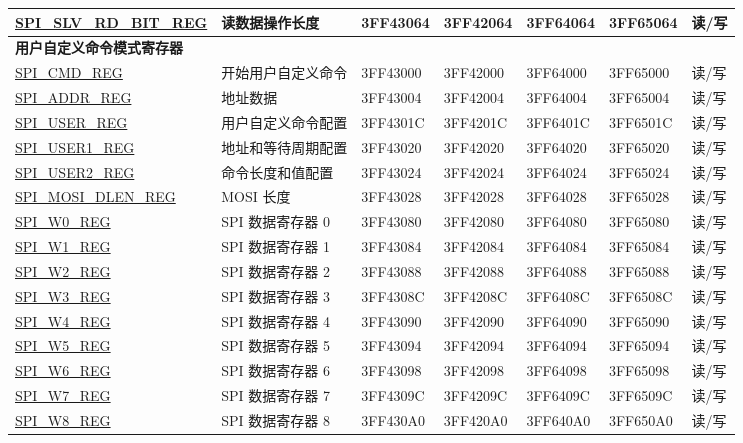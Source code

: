 \begin{longtable}[l]{ | p{5.75cm} | p{3.2cm} | p{1.45cm} | p{1.45cm} | p{1.45cm} | p{1.45cm} |p{0.74cm} | }
\hyperref[regdesc:SPISLVRDBITREG]{SPI\_SLV\_RD\_BIT\_REG} & 读数据操作长度 & 3FF43064 & 3FF42064 & 3FF64064 & 3FF65064 & 读/写 \\ \hline
\multicolumn{7}{|l|}{\textbf{用户自定义命令模式寄存器}} \\ \hline
\hyperref[regdesc:SPICMDREG]{SPI\_CMD\_REG} & 开始用户自定义命令 & 3FF43000 & 3FF42000 & 3FF64000 & 3FF65000 & 读/写 \\ \hline
\hyperref[regdesc:SPIADDRREG]{SPI\_ADDR\_REG} & 地址数据 & 3FF43004 & 3FF42004 & 3FF64004 & 3FF65004 & 读/写 \\ \hline
\hyperref[regdesc:SPIUSERREG]{SPI\_USER\_REG} & 用户自定义命令配置 & 3FF4301C & 3FF4201C & 3FF6401C & 3FF6501C & 读/写 \\ \hline
\hyperref[regdesc:SPIUSER1REG]{SPI\_USER1\_REG} & 地址和等待周期配置 & 3FF43020 & 3FF42020 & 3FF64020 & 3FF65020 & 读/写 \\ \hline
\hyperref[regdesc:SPIUSER2REG]{SPI\_USER2\_REG} & 命令长度和值配置 & 3FF43024 & 3FF42024 & 3FF64024 & 3FF65024 & 读/写 \\ \hline
\hyperref[regdesc:SPIMOSIDLENREG]{SPI\_MOSI\_DLEN\_REG} & MOSI 长度 & 3FF43028 & 3FF42028 & 3FF64028 & 3FF65028 & 读/写 \\ \hline
\hyperref[regdesc:SPIWnREG]{SPI\_W0\_REG} & SPI 数据寄存器 0 & 3FF43080 & 3FF42080 & 3FF64080 & 3FF65080 & 读/写 \\ \hline
\hyperref[regdesc:SPIWnREG]{SPI\_W1\_REG} & SPI 数据寄存器 1 & 3FF43084 & 3FF42084 & 3FF64084 & 3FF65084 & 读/写 \\ \hline
\hyperref[regdesc:SPIWnREG]{SPI\_W2\_REG} & SPI 数据寄存器 2 & 3FF43088 & 3FF42088 & 3FF64088 & 3FF65088 & 读/写 \\ \hline
\hyperref[regdesc:SPIWnREG]{SPI\_W3\_REG} & SPI 数据寄存器 3 & 3FF4308C & 3FF4208C & 3FF6408C & 3FF6508C & 读/写 \\ \hline
\hyperref[regdesc:SPIWnREG]{SPI\_W4\_REG} & SPI 数据寄存器 4 & 3FF43090 & 3FF42090 & 3FF64090 & 3FF65090 & 读/写 \\ \hline
\hyperref[regdesc:SPIWnREG]{SPI\_W5\_REG} & SPI 数据寄存器 5 & 3FF43094 & 3FF42094 & 3FF64094 & 3FF65094 & 读/写 \\ \hline
\hyperref[regdesc:SPIWnREG]{SPI\_W6\_REG} & SPI 数据寄存器 6 & 3FF43098 & 3FF42098 & 3FF64098 & 3FF65098 & 读/写 \\ \hline
\hyperref[regdesc:SPIWnREG]{SPI\_W7\_REG} & SPI 数据寄存器 7 & 3FF4309C & 3FF4209C & 3FF6409C & 3FF6509C & 读/写 \\ \hline
\hyperref[regdesc:SPIWnREG]{SPI\_W8\_REG} & SPI 数据寄存器 8 & 3FF430A0 & 3FF420A0 & 3FF640A0 & 3FF650A0 & 读/写 \\ \hline

\end{longtable}
